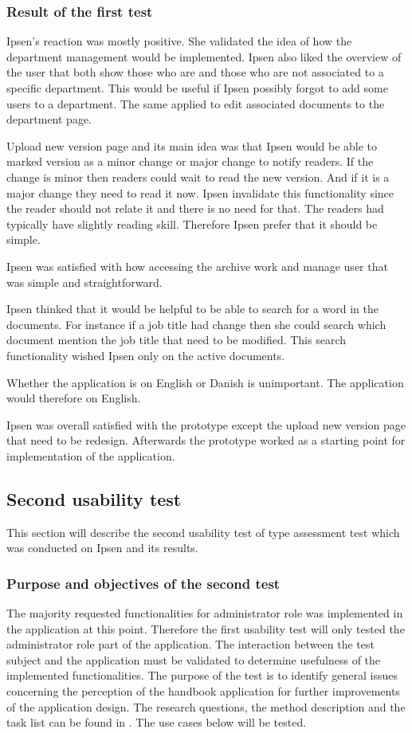 \subsubsection*{Result of the first test}
Ipsen's reaction was mostly positive. 
She validated the idea of how the department management would be implemented. 
Ipsen also liked the overview of the user that both show those who are and those who are not associated to a specific department.
This would be useful if Ipsen possibly forgot to add some users to a department. 
The same applied to edit associated documents to the department page. 

Upload new version page and its main idea was that Ipsen would be able to marked version as a minor change or major change to notify readers. 
If the change is minor then readers could wait to read the new version.
And if it is a major change they need to read it now. 
Ipsen invalidate this functionality since the reader should not relate it and there is no need for that. 
The readers had typically have slightly reading skill. 
Therefore Ipsen prefer that it should be simple. 

Ipsen was satisfied with how accessing the archive work and manage user that was simple and straightforward. 

Ipsen thinked that it would be helpful to be able to search for a word in the documents.
For instance if a job title had change then she could search which document mention the job title that need to be modified.
This search functionality wished Ipsen only on the active documents. 

Whether the application is on English or Danish is unimportant. 
The application would therefore on English. 

Ipsen was overall satisfied with the prototype except the upload new version page that need to be redesign. 
Afterwards the prototype worked as a starting point for implementation of the application. 

\subsection{Second usability test}\label{secondtest}
This section will describe the second usability test	of type assessment test which was conducted on Ipsen and its results.

\subsubsection*{Purpose and objectives of the second test}
The majority requested functionalities for administrator role was implemented in the application at this point. 
Therefore the first usability test will only tested the administrator role part of the application.
The interaction between the test subject and the application must be validated to determine usefulness of the implemented functionalities. 
The purpose of the test is to identify general issues concerning the perception of the handbook application for further improvements of the application design.
The research questions, the method description and the task list can be found in .
The use cases below will be tested.

